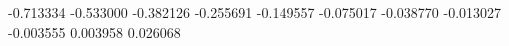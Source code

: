 -0.713334
-0.533000
-0.382126
-0.255691
-0.149557
-0.075017
-0.038770
-0.013027
-0.003555
0.003958
0.026068
